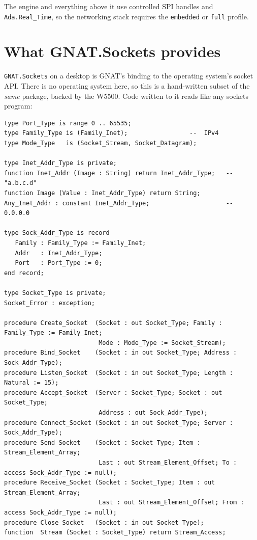 The engine and everything above it use controlled SPI handles and
\texttt{Ada.Real\_Time}, so the networking stack requires the \texttt{embedded} or
\texttt{full} profile.

\section{What GNAT.Sockets provides}
\label{ch:net:gnatsockets}

\texttt{GNAT.Sockets} on a desktop is GNAT's binding to the operating system's
socket API. There is no operating system here, so this is a hand-written subset of
the \emph{same} package, backed by the W5500. Code written to it reads like any
sockets program:

\begin{lstlisting}
type Port_Type is range 0 .. 65535;
type Family_Type is (Family_Inet);                 --  IPv4
type Mode_Type   is (Socket_Stream, Socket_Datagram);

type Inet_Addr_Type is private;
function Inet_Addr (Image : String) return Inet_Addr_Type;   --  "a.b.c.d"
function Image (Value : Inet_Addr_Type) return String;
Any_Inet_Addr : constant Inet_Addr_Type;                     --  0.0.0.0

type Sock_Addr_Type is record
   Family : Family_Type := Family_Inet;
   Addr   : Inet_Addr_Type;
   Port   : Port_Type := 0;
end record;

type Socket_Type is private;
Socket_Error : exception;

procedure Create_Socket  (Socket : out Socket_Type; Family : Family_Type := Family_Inet;
                          Mode : Mode_Type := Socket_Stream);
procedure Bind_Socket    (Socket : in out Socket_Type; Address : Sock_Addr_Type);
procedure Listen_Socket  (Socket : in out Socket_Type; Length : Natural := 15);
procedure Accept_Socket  (Server : Socket_Type; Socket : out Socket_Type;
                          Address : out Sock_Addr_Type);
procedure Connect_Socket (Socket : in out Socket_Type; Server : Sock_Addr_Type);
procedure Send_Socket    (Socket : Socket_Type; Item : Stream_Element_Array;
                          Last : out Stream_Element_Offset; To : access Sock_Addr_Type := null);
procedure Receive_Socket (Socket : Socket_Type; Item : out Stream_Element_Array;
                          Last : out Stream_Element_Offset; From : access Sock_Addr_Type := null);
procedure Close_Socket   (Socket : in out Socket_Type);
function  Stream (Socket : Socket_Type) return Stream_Access;
\end{lstlisting}

